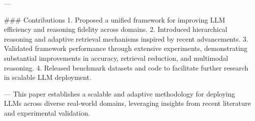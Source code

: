 ---

### Contributions  
1. Proposed a unified framework for improving LLM efficiency and reasoning fidelity across domains.  
2. Introduced hierarchical reasoning and adaptive retrieval mechanisms inspired by recent advancements.  
3. Validated framework performance through extensive experiments, demonstrating substantial improvements in accuracy, retrieval reduction, and multimodal reasoning.  
4. Released benchmark datasets and code to facilitate further research in scalable LLM deployment.  

---  
This paper establishes a scalable and adaptive methodology for deploying LLMs across diverse real-world domains, leveraging insights from recent literature and experimental validation.